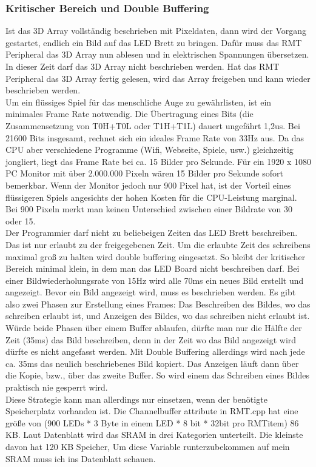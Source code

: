 \documentclass[12pt,a4paper]{article}
\begin{document}
\subsubsection{Kritischer Bereich und Double Buffering}
Ist das 3D Array vollständig beschrieben mit Pixeldaten, dann wird der Vorgang gestartet, endlich ein Bild auf das LED Brett zu bringen. Dafür muss das RMT Peripheral das 3D Array nun ablesen und in elektrischen Spannungen übersetzen. In dieser Zeit darf das 3D Array nicht beschrieben werden. Hat das RMT Peripheral das 3D Array fertig gelesen, wird das Array freigeben und kann wieder beschrieben werden.
\vspace{1ex}\\
Um ein flüssiges Spiel für das menschliche Auge zu gewährlisten, ist ein minimales Frame Rate notwendig. Die Übertragung eines Bits (die Zusammensetzung von T0H+T0L oder T1H+T1L) dauert ungefährt 1,2us. Bei 21600 Bits insgesamt, rechnet sich ein ideales Frame Rate von 33Hz aus. Da das CPU aber verschiedene Programme (Wifi, Webseite, Spiele, usw.) gleichzeitig jongliert, liegt das Frame Rate bei ca. 15 Bilder pro Sekunde. Für ein 1920 x 1080 PC Monitor mit über 2.000.000 Pixeln wären 15 Bilder pro Sekunde sofort bemerkbar. Wenn der Monitor jedoch nur 900 Pixel hat, ist der Vorteil eines flüssigeren Spiels angesichts der hohen Kosten für die CPU-Leistung marginal. Bei 900 Pixeln merkt man keinen Unterschied zwischen einer Bildrate von 30 oder 15.  
\vspace{1ex}\\
Der Programmier darf nicht zu beliebeigen Zeiten das LED Brett beschreiben. Das ist nur erlaubt zu der freigegebenen Zeit. Um die erlaubte Zeit des schreibens maximal groß zu halten wird double buffering eingesetzt. So bleibt der kritischer Bereich minimal klein, in dem man das LED Board nicht beschreiben darf. Bei einer Bildwiederholungsrate von 15Hz wird alle 70ms ein neues Bild erstellt und angezeigt. Bevor ein Bild angezeigt wird, muss es beschrieben werden. Es gibt also zwei Phasen zur Erstellung eines Frames: Das Beschreiben des Bildes, wo das schreiben erlaubt ist, und Anzeigen des Bildes, wo das schreiben nicht erlaubt ist. Würde beide Phasen über einem Buffer ablaufen, dürfte man nur die Hälfte der Zeit (35ms) das Bild beschreiben, denn in der Zeit wo das Bild angezeigt wird dürfte es nicht angefasst werden. Mit Double Buffering allerdings wird nach jede ca. 35ms das neulich beschriebenes Bild kopiert. Das Anzeigen läuft dann über die Kopie, bzw., über das zweite Buffer. So wird einem das Schreiben eines Bildes praktisch nie gesperrt wird. 
\vspace{1ex}\\
Diese Strategie kann man allerdings nur einsetzen, wenn der benötigte Speicherplatz vorhanden ist. Die Channelbuffer attribute in RMT.cpp hat eine größe von (900 LEDs * 3 Byte in einem LED * 8 bit * 32bit pro RMT\textunderscore item) 86 KB. Laut Datenblatt wird das SRAM in drei Kategorien unterteilt. Die kleinste davon hat 120 KB Speicher, Um diese Variable runterzubekommen auf mein SRAM muss ich ins Datenblatt schauen.
\end{document}
